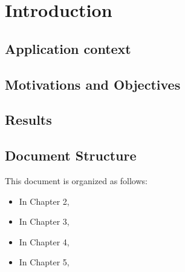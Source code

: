 \chapter{Introduction}

\section{Application context}
\section{Motivations and Objectives}
\section{Results}

\section{Document Structure}
This document is organized as follows:
\begin{itemize}
    \item In Chapter 2, 
    \item In Chapter 3,
    \item In Chapter 4,
    \item In Chapter 5,
\end{itemize}